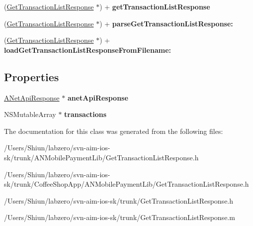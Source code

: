 \begin{DoxyCompactItemize}
\item 
\hypertarget{interface_get_transaction_list_response_a746135f7657b663e18a062e1c504e981}{
(\hyperlink{interface_get_transaction_list_response}{GetTransactionListResponse} $\ast$) + {\bfseries getTransactionListResponse}}
\label{interface_get_transaction_list_response_a746135f7657b663e18a062e1c504e981}

\item 
\hypertarget{interface_get_transaction_list_response_a295e774b70786bead32eeaaf8d3f6a22}{
(\hyperlink{interface_get_transaction_list_response}{GetTransactionListResponse} $\ast$) + {\bfseries parseGetTransactionListResponse:}}
\label{interface_get_transaction_list_response_a295e774b70786bead32eeaaf8d3f6a22}

\item 
\hypertarget{interface_get_transaction_list_response_ab915f5978c9e03602ebdc52e3de9e97d}{
(\hyperlink{interface_get_transaction_list_response}{GetTransactionListResponse} $\ast$) + {\bfseries loadGetTransactionListResponseFromFilename:}}
\label{interface_get_transaction_list_response_ab915f5978c9e03602ebdc52e3de9e97d}

\end{DoxyCompactItemize}
\subsection*{Properties}
\begin{DoxyCompactItemize}
\item 
\hypertarget{interface_get_transaction_list_response_a426cc13990ed70c1978163737ec39929}{
\hyperlink{interface_a_net_api_response}{ANetApiResponse} $\ast$ {\bfseries anetApiResponse}}
\label{interface_get_transaction_list_response_a426cc13990ed70c1978163737ec39929}

\item 
\hypertarget{interface_get_transaction_list_response_a1e347dbe66c467199f97b85873a1b4e0}{
NSMutableArray $\ast$ {\bfseries transactions}}
\label{interface_get_transaction_list_response_a1e347dbe66c467199f97b85873a1b4e0}

\end{DoxyCompactItemize}


The documentation for this class was generated from the following files:\begin{DoxyCompactItemize}
\item 
/Users/Shiun/labzero/svn-\/aim-\/ios-\/sk/trunk/ANMobilePaymentLib/GetTransactionListResponse.h\item 
/Users/Shiun/labzero/svn-\/aim-\/ios-\/sk/trunk/CoffeeShopApp/ANMobilePaymentLib/GetTransactionListResponse.h\item 
/Users/Shiun/labzero/svn-\/aim-\/ios-\/sk/trunk/GetTransactionListResponse.h\item 
/Users/Shiun/labzero/svn-\/aim-\/ios-\/sk/trunk/GetTransactionListResponse.m\end{DoxyCompactItemize}

